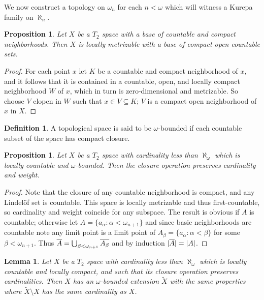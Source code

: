 \documentclass{amsart}
\theoremstyle{plain}
\newtheorem{lemma}[theorem]{Lemma}
\newtheorem{proposition}[theorem]{Proposition}
\theoremstyle{definition}
\newtheorem{definition}[theorem]{Definition}
\theoremstyle{remark}
\theoremstyle{plain}
\theoremstyle{definition}
\theoremstyle{remark}
\begin{document}
  We now construct a topology on \(\omega_n\) for each \(n<\omega\) which
  will witness a Kurepa family on \(\aleph_n\).

  \begin{proposition}
    Let \(X\) be a \(T_2\) space with a base of countable and compact
    neighborhoods. Then \(X\) is locally metrizable with
    a base of compact open countable sets.
  \end{proposition}

  \begin{proof}
    For each point \(x\) let \(K\) be a countable and compact neighborhood
    of \(x\), and it follows that it is contained in a countable, open,
    and locally compact neighborhood \(W\) of \(x\), which in turn
    is zero-dimensional and metrizable. So choose \(V\) clopen
    in \(W\) such that \(x\in V\subseteq K\); \(V\) is a compact open
    neighborhood of \(x\) in \(X\).
  \end{proof}

  \begin{definition}
    A topological space is said to be \(\omega\)-bounded if each countable
    subset of the space has compact closure.
  \end{definition}

  \begin{proposition}
    Let \(X\) be a \(T_2\) space with cardinality less than \(\aleph_\omega\)
    which is locally countable and
    \(\omega\)-bounded. Then the closure operation preserves cardinality and
    weight.
  \end{proposition}

  \begin{proof}
    Note that the closure of any countable neighborhood is compact, and
    any Lindel\"of set is countable. This space is locally metrizable
    and thus first-countable, so cardinality and weight coincide for any
    subspace. The result is obvious if \(A\) is countable; otherwise
    let \(A=\{a_\alpha:\alpha<\omega_{n+1}\}\) and since basic neighborhoods
    are countable note any limit point is
    a limit point of \(A_\beta=\{a_\alpha:\alpha<\beta\}\)
    for some \(\beta<\omega_{n+1}\).
    Thus \(\overline{A}=\bigcup_{\beta<\omega_{n+1}}\overline{A_\beta}\) and
    by induction \(|\overline{A}|=|A|\).
  \end{proof}

  \begin{lemma}
    Let \(X\) be a \(T_2\) space with cardinality less than \(\aleph_\omega\)
    which is locally countable and locally compact, and such that
    its closure operation preserves cardinalities.
    Then \(X\) has an \(\omega\)-bounded extension \(\tilde X\)
    with the same properties where \(\tilde X\setminus X\) has the same
    cardinality as \(X\).
  \end{lemma}
\end{document}
